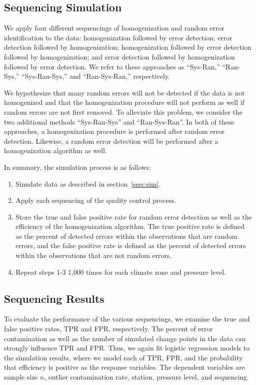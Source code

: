 \documentclass[12pt]{article}
\begin{document}
\begin{doublespacing}
\subsection{Sequencing Simulation}

We apply four different sequencings of homogenization and random error identification to the data: homogenization followed by error detection; error detection followed by homogenization; homogenization followed by error detection followed by homogenization; and error detection followed by homogenization followed by error detection.  We refer to these approaches as ``Sys-Ran,'' ``Ran-Sys,'' ``Sys-Ran-Sys,'' and ``Ran-Sys-Ran,'' respectively.

We hypothesize that many random errors will not be detected if the data is not homogenized and that the homogenization procedure will not perform as well if random errors are not first removed.  To alleviate this problem, we consider the two additional methods ``Sys-Ran-Sys'' and ``Ran-Sys-Ran''.  In both of these approaches, a homogenization procedure is performed after random error detection.  Likewise, a random error detection will be performed after a homogenization algorithm as well.

In summary, the simulation process is as follows:

\begin{enumerate}
	\item Simulate data as described in section~\ref{ssec:sim}.
	\item Apply each sequencing of the quality control process.
	\item Store the true and false positive rate for random error detection as well as the efficiency of the homogenization algorithm.  The true positive rate is defined as the percent of detected errors within the observations that are random errors, and the false positive rate is defined as the percent of detected errors within the observations that are not random errors.
	\item Repeat steps 1-3 1,000 times for each climate zone and pressure level.
\end{enumerate}

\subsection{Sequencing Results}

To evaluate the performance of the various sequencings, we examine the true and false positive rates, TPR and FPR, respectively.  The percent of error contamination as well as the number of simulated change points in the data can strongly influence TPR and FPR.  Thus, we again fit logistic regression models to the simulation results, where we model each of TPR, FPR, and the probability that efficiency is positive as the response variables.  The dependent variables are sample size $n$, outlier contamination rate, station, pressure level, and sequencing.


\end{doublespacing}
\end{document}
